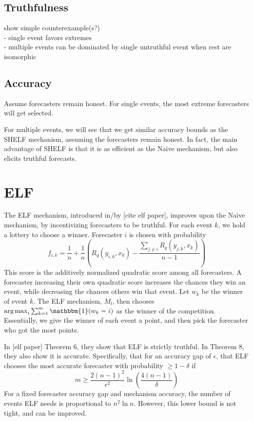 \documentclass[letterpaper,12pt]{article}
\DeclareMathOperator*{\argmax}{arg\,max}
\newcommand{\1}{\mathbbm{1}}
\begin{document}
\subsection{Truthfulness}
show simple counterexample(s?) \\
- single event favors extremes \\
- multiple events can be dominated by single untruthful event when rest are isomorphic \\

\subsection{Accuracy}

Assume forecasters remain honest. For single events, the most extreme forecasters will get selected. 

For multiple events, we will see that we get similar accuracy bounds as the SHELF mechanism, assuming the forecasters remain honest. In fact, the main advantage of SHELF is that it is as efficient as the Naive mechanism, but also elicits truthful forecasts.

\section{ELF}
The ELF mechanism, introduced in/by [cite elf paper], improves upon the Naive mechanism, by incentivizing forecasters to be truthful. For each event $k$, we hold a lottery to choose a winner. Forecaster $i$ is chosen with probability
\[ f_{i, k} = \frac{1}{n} + \frac{1}{n} \left(R_q(y_{i, k}, x_k) - \frac{\sum_{j\neq i} R_q(y_{j, k}, x_k)}{n-1} \right)\]
This score is the additively normalized quadratic score among all forecasters. A forecaster increasing their own quadratic score increases the chances they win an event, while decreasing the chances others win that event. Let $w_k$ be the winner of event $k$. The ELF mechanism, $M_l$, then chooses $\argmax_i \sum_{k=1}^m \1(w_k = i)$ as the winner of the competition. Essentially, we give the winner of each event a point, and then pick the forecaster who got the most points.

In [elf paper] Theorem 6, they show that ELF is strictly truthful. In Theorem 8, they also show it is accurate. Specifically, that for an accuracy gap of $\epsilon$, that ELF chooses the most accurate forecaster with probability $ \geq 1 - \delta$ if
\[ m \geq \frac{2(n-1)^2}{\epsilon^2} \ln \left(\frac{4(n-1)}{\delta}\right)\]
For a fixed forecaster accuracy gap and mechanism accuracy, the number of events ELF needs is proportional to $n^2 \ln n$. However, this lower bound is not tight, and can be improved. 
\end{document}
